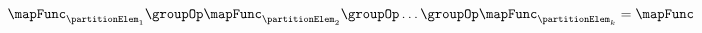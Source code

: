 \begin{equation}
    \centering
    \label{equ:partcomp}
    \begin{aligned}
            \mapFunc_{\partitionElem_{1}}
            \groupOp \mapFunc_{\partitionElem_{2}}
            \groupOp \ldots
            \groupOp \mapFunc_{\partitionElem_{k}}
            = \mapFunc
    \end{aligned}
\end{equation}
